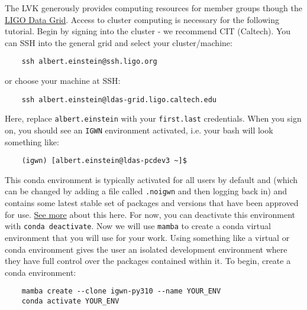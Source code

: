 \documentclass{article}
\begin{document}
The LVK generously provides computing resources for member groups though the \href{https://computing.docs.ligo.org/guide/computing-centres/ldg/}{LIGO Data Grid}. Access to cluster computing is necessary for the following tutorial. Begin by signing into the cluster - we recommend CIT (Caltech). You can SSH into the general grid and select your cluster/machine:
\begin{verbatim}
    ssh albert.einstein@ssh.ligo.org
\end{verbatim}
or choose your machine at SSH:
\begin{verbatim}
    ssh albert.einstein@ldas-grid.ligo.caltech.edu
\end{verbatim}
Here, replace \texttt{albert.einstein} with your \texttt{first.last} credentials. When you sign on, you should see an \texttt{IGWN} environment activated, i.e. your bash will look something like:
\begin{verbatim}
    (igwn) [albert.einstein@ldas-pcdev3 ~]$
\end{verbatim}
This conda environment is typically activated for all users by default and (which can be changed by adding a file called \texttt{.noigwn} and then logging back in) and contains some latest stable set of packages and versions that have been approved for use. \href{https://computing.docs.ligo.org/conda/environments/}{See more} about this here. For now, you can deactivate this environment with \texttt{conda deactivate}. Now we will use \texttt{mamba} to create a conda virtual environment that you will use for your work. Using something like a virtual or conda environment gives the user an isolated development environment where they have full control over the packages contained within it. 
To begin, create a conda environment:
\begin{verbatim}
    mamba create --clone igwn-py310 --name YOUR_ENV
    conda activate YOUR_ENV
\end{verbatim}
\end{document}
